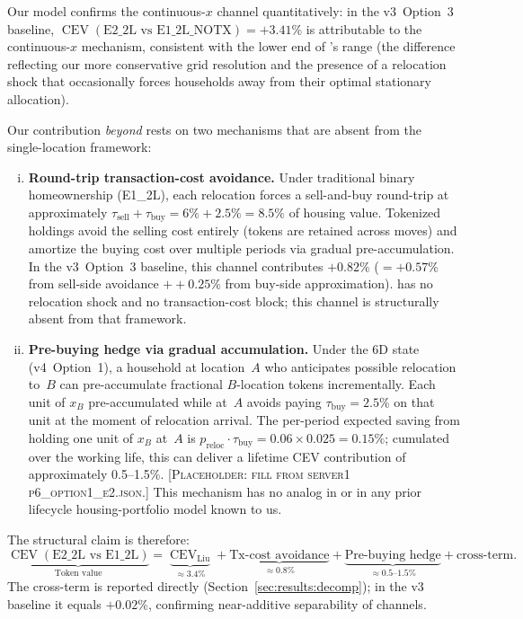 Our model confirms the continuous-$x$ channel quantitatively: in the
v3~Option~3 baseline, $\operatorname{CEV}(\text{E2\_2L vs E1\_2L\_NOTX}) =
+3.41\%$ is attributable to the continuous-$x$ mechanism, consistent with
the lower end of \citeauthor{Liu2021}'s range
(the difference reflecting our more conservative grid resolution and the
presence of a relocation shock that occasionally forces households away from
their optimal stationary allocation).

Our contribution \emph{beyond} \citeauthor{Liu2021} rests on two mechanisms
that are absent from the single-location framework:
\begin{enumerate}[(i)]
\item \textbf{Round-trip transaction-cost avoidance.}
      Under traditional binary homeownership (E1\_2L), each relocation forces
      a sell-and-buy round-trip at approximately $\tau_{\text{sell}} +
      \tau_{\text{buy}} = 6\% + 2.5\% = 8.5\%$ of housing value.
      Tokenized holdings avoid the selling cost entirely (tokens are retained
      across moves) and amortize the buying cost over multiple periods via
      gradual pre-accumulation.
      In the v3~Option~3 baseline, this channel contributes
      $+0.82\%$ ($= +0.57\%$ from sell-side avoidance $+ +0.25\%$ from
      buy-side approximation).
      \citeauthor{Liu2021} has no relocation shock and no transaction-cost
      block; this channel is structurally absent from that framework.

\item \textbf{Pre-buying hedge via gradual accumulation.}
      Under the 6D state (v4~Option~1), a household at location~$A$ who
      anticipates possible relocation to~$B$ can pre-accumulate fractional
      $B$-location tokens incrementally.
      Each unit of $x_B$ pre-accumulated while at~$A$ avoids paying
      $\tau_{\text{buy}} = 2.5\%$ on that unit at the moment of relocation
      arrival.
      The per-period expected saving from holding one unit of $x_B$ at~$A$
      is $p_{\text{reloc}} \cdot \tau_{\text{buy}} = 0.06 \times 0.025 =
      0.15\%$; cumulated over the working life, this can deliver a
      lifetime CEV contribution of approximately 0.5--1.5\%.
      [\textsc{Placeholder: fill from server1 p6\_option1\_e2.json.}]
      This mechanism has no analog in \citeauthor{Liu2021} or in any prior
      lifecycle housing-portfolio model known to us.
\end{enumerate}

The structural claim is therefore:
\begin{equation}
    \underbrace{\operatorname{CEV}(\text{E2\_2L vs E1\_2L})}_{\text{Token
    value}} =
    \underbrace{\operatorname{CEV}_{\text{Liu}}}_{\approx 3.4\%}
    + \underbrace{\text{Tx-cost avoidance}}_{\approx 0.8\%}
    + \underbrace{\text{Pre-buying hedge}}_{\approx 0.5\text{--}1.5\%}
    + \text{cross-term}.
    \label{eq:decomp_claim}
\end{equation}
The cross-term is reported directly (Section~\ref{sec:results:decomp});
in the v3 baseline it equals $+0.02\%$, confirming near-additive separability
of channels.


